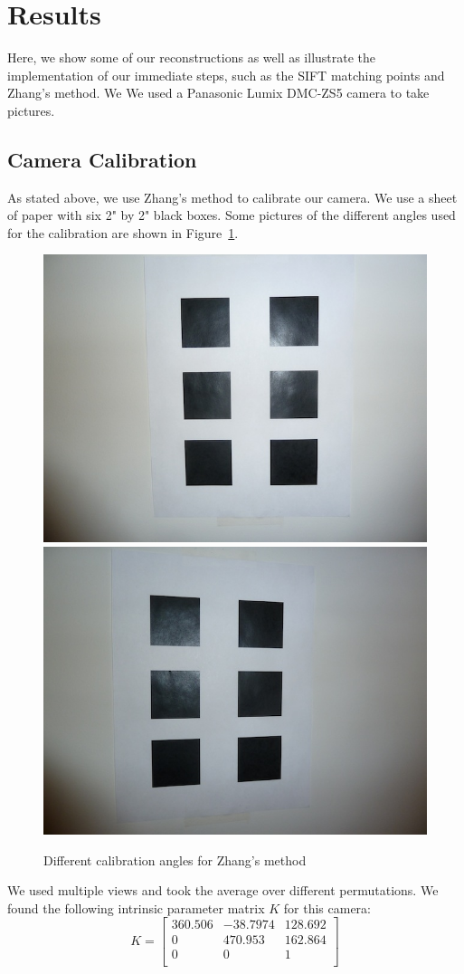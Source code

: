 \section{Results}
\label{s:results}

Here, we show some of our reconstructions as well as illustrate the implementation of our immediate steps, such as the SIFT matching points and Zhang's method. We We used a Panasonic Lumix DMC-ZS5 camera to take pictures.

\subsection{Camera Calibration}
As stated above, we use Zhang's method to calibrate our camera. We use a sheet of paper with six 2" by 2" black boxes. Some pictures of the different angles used for the calibration are shown in Figure~\ref{calib_pics}. 

\begin{figure}[H]
\begin{center}
\includegraphics[width=0.45\linewidth]{figures/calib1.jpg}
\includegraphics[width=0.45\linewidth]{figures/calib2.jpg}
\end{center}
\caption{Different calibration angles for Zhang's method}
\label{calib_pics}
\end{figure}

We used multiple views and took the average over different permutations. We found the following intrinsic parameter matrix $K$ for this camera:
\begin{equation*}
K =
  \left[ {\begin{array}{ccc}
   360.506 & -38.7974 & 128.692  \\
  0 & 470.953 & 162.864 \\
   0 & 0 & 1 \\
  \end{array} } \right]
\end{equation*}

